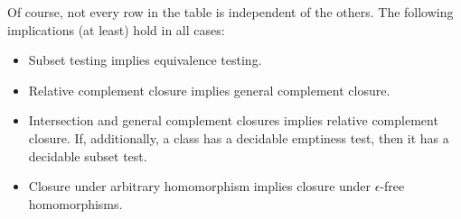 Of course, not every row in the table is independent of the others.  The
following implications (at least) hold in all cases:
\begin{itemize}
	\item Subset testing implies equivalence testing.
	\item Relative complement closure implies general complement closure.
	\item Intersection and general complement closures implies
          relative complement closure.  If, additionally, a class has
          a decidable emptiness test, then it has a decidable subset test.
	\item Closure under arbitrary homomorphism implies closure under
          $\epsilon$-free homomorphisms.
\end{itemize}

